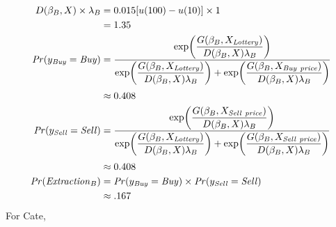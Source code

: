 \documentclass[../main.tex]{subfiles}
\begin{document}
\begin{align}
	\label{eq2:Beth}
	\begin{split}
	D(\beta_B,X) \times \lambda_B &= 0.015[u(100) - u(10)] \times 1\\
	&= 1.35 \\
	{\mathit{Pr}}(y_{\mathit{Buy}} = \mathit{Buy}) &=\dfrac{\exp\!\left( \dfrac{ G(\beta_B,X_{\mathit{Lottery}}) }{ D(\beta_B,X)\lambda_B }  \right)}{ \exp\!\left( \dfrac{ G(\beta_B,X_{\mathit{Lottery}}) }{ D(\beta_B,X)\lambda_B }  \right) + \exp\!\left( \dfrac{ G(\beta_B,X_{\mathit{Buy\ price}}) }{ D(\beta_B,X)\lambda_B }  \right)  }\\[0.5ex]
	&\approx 0.408 \\
	{\mathit{Pr}}(y_{\mathit{Sell}} = \mathit{Sell}) &=\dfrac{\exp\!\left( \dfrac{ G(\beta_B,X_{\mathit{Sell\ price}}) }{ D(\beta_B,X)\lambda_B }  \right)}{ \exp\!\left( \dfrac{ G(\beta_B,X_{\mathit{Lottery}}) }{ D(\beta_B,X)\lambda_B }  \right) + \exp\!\left( \dfrac{ G(\beta_B,X_{\mathit{Sell\ price}}) }{ D(\beta_B,X)\lambda_B }  \right)  }\\[0.5ex]
	&\approx 0.408 \\
	{\mathit{Pr}}(\mathit{Extraction}_B) &= {\mathit{Pr}}(y_{\mathit{Buy}} = \mathit{Buy}) \times {\ensuremath{\mathit{Pr}}}(y_{\mathit{Sell}} = \mathit{Sell})\\
	&\approx .167
	\end{split}
\end{align}
\noindent For Cate,
\end{document}
